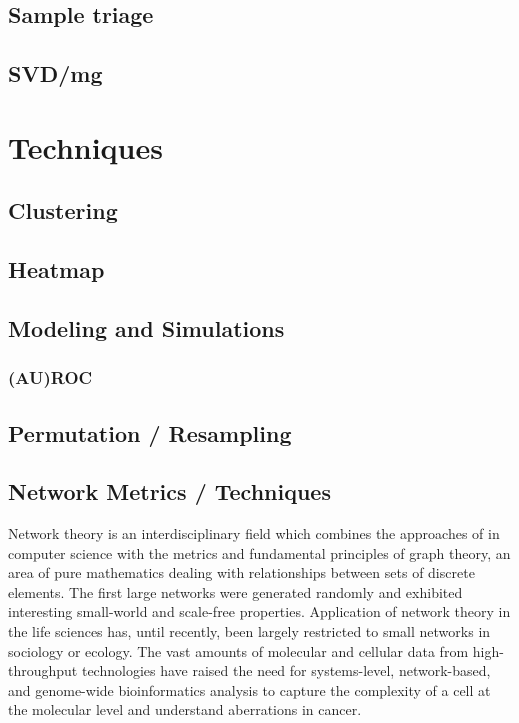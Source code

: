 \subsection{Sample triage}
\subsection{SVD/mg}
\section{Techniques}
\subsection{Clustering}
\subsection{Heatmap}
\subsection{Modeling and Simulations}
\subsubsection{(AU)ROC}
\subsection{Permutation / Resampling}
\subsection{Network Metrics / Techniques}

Network theory is an interdisciplinary field which combines the approaches of in computer science with the metrics and fundamental principles of graph theory, an area of pure mathematics dealing with relationships between sets of discrete elements. The first large networks were generated randomly and exhibited interesting small-world and scale-free properties. Application of network theory in the life sciences has, until recently, been largely restricted to small networks in sociology or ecology. The vast amounts of molecular and cellular data from high-throughput technologies have raised the need for systems-level, network-based, and genome-wide bioinformatics analysis to capture the complexity of a cell at the molecular level and understand aberrations in cancer. 

